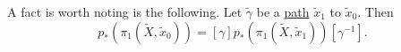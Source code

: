 \begin{remark}
	A fact is worth noting is the following. Let \(\widetilde{\gamma} \) be a \hyperref[def:path]{path} \(\widetilde{x} _1\) to \(\widetilde{x} _0\). Then
	\[
		p_\ast (\pi _1(\widetilde{X} , \widetilde{x} _0))= [\gamma ] p_\ast (\pi _1(\widetilde{X} , \widetilde{x} _1)) [\gamma ^{-1}].
	\]
	\begin{figure}[H]
		\centering
		\label{fig:rmk:lec17:1}
	\end{figure}
\end{remark}